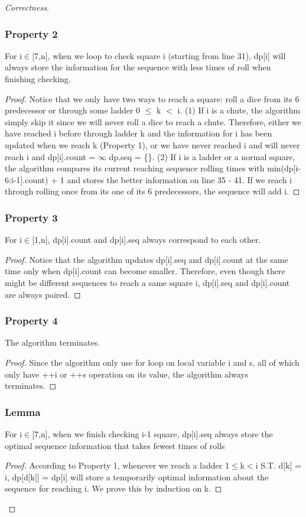 \documentclass[openany]{article}
\begin{document}
\begin{proof}[Correctness]{}
\subsubsection*{Property 2}
    For i$\in$[7,n], when we loop to check square i (starting from line 31), dp[i] will always store the information for the sequence with less times of roll when finishing checking.
    \begin{proof}
        Notice that we only have two ways to reach a square: roll a dice from its 6 predecessor or through some ladder 0 $\leq$ k $<$ i.
        (1) If i is a chute, the algorithm simply skip it since we will never roll a dice to reach a chute. Therefore, either we have reached i before through ladder k and the information for i has been updated when we reach k (Property 1), or we have never reached i and will never reach i and dp[i].count = $\infty$ dp.seq = \{\}.
        (2) If i is a ladder or a normal square, the algorithm compares its current reaching sequence rolling times with min(dp[i-6:i-1].count) + 1 and stores the better information on line 35 - 41. If we reach i through rolling once from its one of its 6 predecessors, the sequence will add i.
    \end{proof}

\subsubsection*{Property 3}
    For i$\in$[1,n], dp[i].count and dp[i].seq always correspond to each other.
    \begin{proof}
        Notice that the algorithm updates dp[i].seq and dp[i].count at the same time only when dp[i].count can become smaller. Therefore, even though there might be different sequences to reach a same square i, dp[i].seq and dp[i].count are always paired.
    \end{proof}

\subsubsection*{Property 4}
    The algorithm terminates.
    \begin{proof}
        Since the algorithm only use for loop on local variable i and s, all of which only have ++i or ++s operation on its value, the algorithm always terminates.
    \end{proof}
\subsubsection*{Lemma}
    For i$\in$[7,n], when we finish checking i-1 square, dp[i].seq always store the optimal sequence information that takes fewest times of rolls
    \begin{proof}
        According to Property 1, whenever we reach a ladder 1$\leq$k$<$i S.T. d[k] = i, dp[d[k]] = dp[i] will store a temporarily optimal information about the sequence for reaching i. We prove this by induction on k.
        

\end{proof}
\end{proof}
\end{document}
